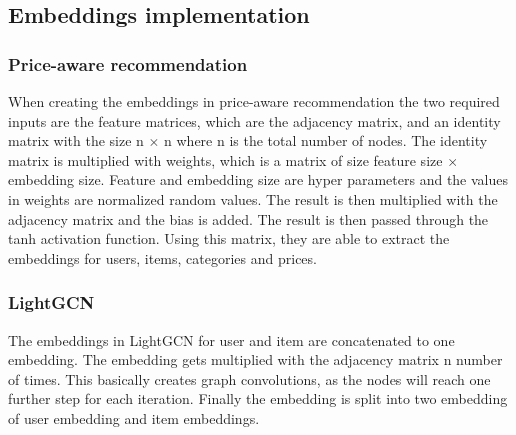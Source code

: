 \subsection{Embeddings implementation}
\subsubsection{Price-aware recommendation}
When creating the embeddings in price-aware recommendation the two required inputs are the feature matrices, which are the adjacency matrix, and an identity matrix with the size n $\times$ n where n is the total number of nodes.
The identity matrix is multiplied with weights, which is a matrix of size feature size $\times$ embedding size.
Feature and embedding size are hyper parameters and the values in weights are normalized random values.
The result is then multiplied with the adjacency matrix and the bias is added.
The result is then passed through the tanh activation function.
Using this matrix, they are able to extract the embeddings for users, items, categories and prices.

\subsubsection{LightGCN}
The embeddings in LightGCN for user and item are concatenated to one embedding.
The embedding gets multiplied with the adjacency matrix n number of times.
This basically creates graph convolutions, as the nodes will reach one further step for each iteration.
Finally the embedding is split into two embedding of user embedding and item embeddings.

